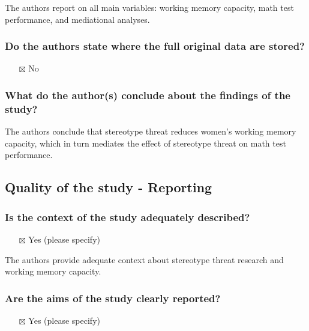 \documentclass[
  doc, a4paper]{apa7}
\providecommand{\tightlist}{%
  \setlength{\itemsep}{0pt}\setlength{\parskip}{0pt}}
\begin{document}
The authors report on all main variables: working memory capacity, math test performance, and mediational analyses.

\subsubsection{Do the authors state where the full original data are stored?}\label{do-the-authors-state-where-the-full-original-data-are-stored}

\begin{itemize}
\tightlist
\item[$\boxtimes$]
  No
\end{itemize}

\subsubsection{What do the author(s) conclude about the findings of the study?}\label{what-do-the-authors-conclude-about-the-findings-of-the-study}

The authors conclude that stereotype threat reduces women's working memory capacity, which in turn mediates the effect of stereotype threat on math test performance.

\subsection{Quality of the study - Reporting}\label{quality-of-the-study---reporting}

\subsubsection{Is the context of the study adequately described?}\label{is-the-context-of-the-study-adequately-described}

\begin{itemize}
\tightlist
\item[$\boxtimes$]
  Yes (please specify)
\end{itemize}

The authors provide adequate context about stereotype threat research and working memory capacity.

\subsubsection{Are the aims of the study clearly reported?}\label{are-the-aims-of-the-study-clearly-reported}

\begin{itemize}
\tightlist
\item[$\boxtimes$]
  Yes (please specify)
\end{itemize}
\end{document}
